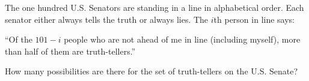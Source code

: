 The one hundred U.S. Senators are standing in a line in alphabetical order. Each senator either always tells the truth or always lies. The $i$th person in line says:

``Of the $101-i$ people who are not ahead of me in line (including myself), more than half of them are truth-tellers.''

How many possibilities are there for the set of truth-tellers on the U.S. Senate?
